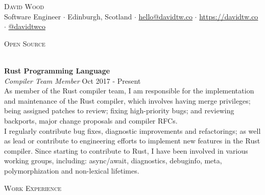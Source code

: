 \documentclass[a4paper]{article}
\newcommand{\lineunder} {
  \vspace*{-8pt} \\
  \hspace*{-18pt} \hrulefill \\
}
\newcommand{\header} [1] {
  {\hspace*{-18pt}\vspace*{6pt} \textsc{#1}}
  \vspace*{-6pt} \lineunder
}
\begin{document}
\fancyhead{}
\renewcommand{\headrulewidth}{0pt}

\fancyfoot{}
\fancyfoot[R]{\scriptsize\scshape\color{gray} \thepage}

\vspace*{-40pt}

\vspace*{-10pt}
\begin{center}
  {\Huge \scshape {David Wood}} \\
  \vspace{2mm}
  Software Engineer $\cdot$
  Edinburgh, Scotland $\cdot$
  \href{mailto:hello@davidtw.co}{hello@davidtw.co} $\cdot$
  \href{https://davidtw.co}{https://davidtw.co} $\cdot$
  \href{https://github.com/davidtwco}{@davidtwco} \\
\end{center}

\header{Open Source}
\vspace{1mm}

\textbf{Rust Programming Language} \\
\textit{Compiler Team Member} \hfill {\color{gray} Oct 2017 - Present} \\
\vspace{2mm}
As member of the Rust compiler team, I am responsible for the implementation and maintenance of
the Rust compiler, which involves having merge privileges; being assigned patches to review;
fixing high-priority bugs; and reviewing backports, major change proposals and compiler RFCs. \\
\vspace{2mm}
I regularly contribute bug fixes, diagnostic improvements and refactorings; as
well as lead or contribute to engineering efforts to implement new features in the Rust compiler.
Since starting to contribute to Rust, I have been involved in various working groups, including:
async/await, diagnostics, debuginfo, meta, polymorphization and non-lexical lifetimes.
\vspace{2mm}

\header{Work Experience}
\vspace{1mm}
\end{document}
